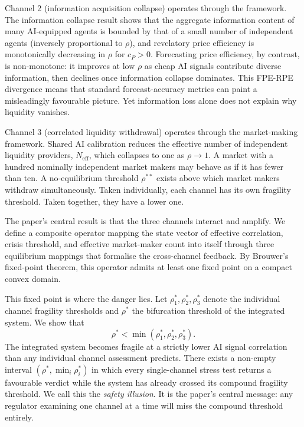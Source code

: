 Channel 2 (information acquisition collapse) operates through the \citet{grossman1980} framework. The information collapse result shows that the aggregate information content of many AI-equipped agents is bounded by that of a small number of independent agents (inversely proportional to $\rho$), and revelatory price efficiency is monotonically decreasing in $\rho$ for $c_P > 0$. Forecasting price efficiency, by contrast, is non-monotone: it improves at low $\rho$ as cheap AI signals contribute diverse information, then declines once information collapse dominates. This FPE-RPE divergence means that standard forecast-accuracy metrics can paint a misleadingly favourable picture. Yet information loss alone does not explain why liquidity vanishes.

Channel 3 (correlated liquidity withdrawal) operates through the \citet{avellaneda2008} market-making framework. Shared AI calibration reduces the effective number of independent liquidity providers, $N_{\text{eff}}$, which collapses to one as $\rho \to 1$. A market with a hundred nominally independent market makers may behave as if it has fewer than ten. A no-equilibrium threshold $\rho^{**}$ exists above which market makers withdraw simultaneously. Taken individually, each channel has its own fragility threshold. Taken together, they have a lower one.

The paper's central result is that the three channels interact and amplify. We define a composite operator mapping the state vector of effective correlation, crisis threshold, and effective market-maker count into itself through three equilibrium mappings that formalise the cross-channel feedback. By Brouwer's fixed-point theorem, this operator admits at least one fixed point on a compact convex domain.

This fixed point is where the danger lies. Let $\rho_1^*, \rho_2^*, \rho_3^*$ denote the individual channel fragility thresholds and $\rho^*$ the bifurcation threshold of the integrated system. We show that
\begin{equation}\label{eq:main-result-intro}
  \rho^* < \min(\rho_1^*, \rho_2^*, \rho_3^*).
\end{equation}
The integrated system becomes fragile at a strictly lower AI signal correlation than any individual channel assessment predicts. There exists a non-empty interval $(\rho^*, \min_i \rho_i^*)$ in which every single-channel stress test returns a favourable verdict while the system has already crossed its compound fragility threshold. We call this the \emph{safety illusion}. It is the paper's central message: any regulator examining one channel at a time will miss the compound threshold entirely.

